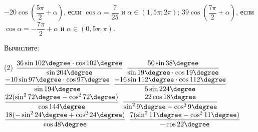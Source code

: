 \begin{class}[number=5]
\begin{listofex}
\begin{tasks}
			\task \( -20 \cos \left( \dfrac{ 5\pi }{ 2 }+ \alpha \right) \), если \( \cos \alpha = \dfrac{ 7 }{ 25 } \) и \( \alpha \in (1,5\pi; 2\pi) \);
			\task \( 39 \cos \left( \dfrac{ 7\pi }{ 2 } + \alpha \right) \), если \( \cos \alpha = -\dfrac{ 7\pi }{ 2 } + \alpha \) и \( \alpha \in (0,5\pi;\pi) \).
		\end{tasks}
		\item Вычислите:
		\begin{tasks}(2)
			\task \( \dfrac{ 36 \sin 102 \degree \cdot \cos 102 \degree }{ \sin 204 \degree } \)
			\task \( \dfrac{ 50 \sin 38 \degree }{ \sin 19 \degree \cdot \cos 19 \degree } \)
			\task \( \dfrac{ -10 \sin 97 \degree \cdot \cos 97 \degree }{ \sin 194 \degree } \)
			\task \( \dfrac{ -16 \sin 112 \degree \cdot \cos 112 \degree }{ 5 \sin 224 \degree } \)
			\task \( \dfrac{22 (\sin^2 72 \degree - \cos^2 72 \degree)}{ \cos 144 \degree } \)
			\task \( \dfrac{ 22 \cos 18 \degree }{ \sin^2 9 \degree - \cos^2 9 \degree  } \)
			\task \( \dfrac{ 18(-\sin^2 24 \degree + \cos^2 24 \degree) }{ \cos 48 \degree } \)
			\task \( \dfrac{ 7(\sin^2 11 \degree - \cos^2 11 \degree) }{ -\cos 22 \degree } \)
		\end{tasks}
	\end{listofex}
\end{class}

